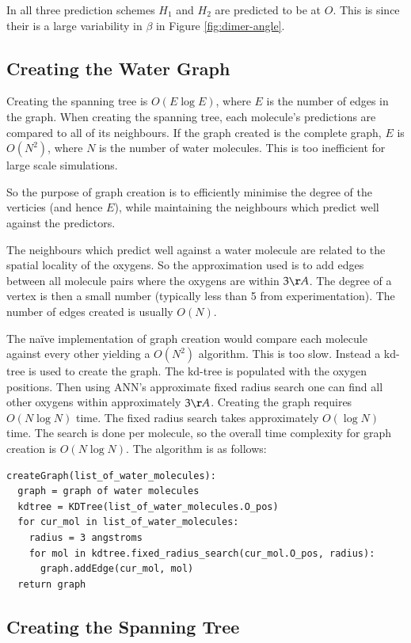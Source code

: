 \documentclass[a4paper]{report}
\begin{document}
In all three prediction schemes $H_1$ and $H_2$ are predicted to be at
$O$. This is since their is a large variability in $\beta$ in Figure
\ref{fig:dimer-angle}.


\subsection{Creating the Water Graph}

Creating the spanning tree is $O(E \log E)$, where $E$ is the number of edges
in the graph. When creating the spanning tree, each molecule's predictions are
compared to all of its neighbours. If the graph created is the complete graph,
$E$ is $O(N^2)$, where $N$ is the number of water molecules. This is too
inefficient for large scale simulations.

So the purpose of graph creation is to efficiently minimise the degree of the
verticies (and hence $E$), while maintaining the neighbours which predict well
against the predictors.

The neighbours which predict well against a water molecule are related to the
spatial locality of the oxygens. So the approximation used is to add edges
between all molecule pairs where the oxygens are within $3\AA$. The degree of
a vertex is then a small number (typically less than 5 from
experimentation). The number of edges created is usually $O(N)$.

The na\"{i}ve implementation of graph creation would compare each molecule
against every other yielding a $O(N^2)$ algorithm. This is too slow. Instead a
kd-tree is used to create the graph. The kd-tree is populated with the oxygen
positions. Then using ANN's approximate fixed radius search one can find all
other oxygens within approximately $3\AA$. Creating the graph requires $O(N
\log N)$ time. The fixed radius search takes approximately $O(\log N)$
time. The search is done per molecule, so the overall time complexity for
graph creation is $O(N \log N)$. The algorithm is as follows:

\begin{verbatim}
createGraph(list_of_water_molecules):
  graph = graph of water molecules
  kdtree = KDTree(list_of_water_molecules.O_pos)
  for cur_mol in list_of_water_molecules:
    radius = 3 angstroms
    for mol in kdtree.fixed_radius_search(cur_mol.O_pos, radius):
      graph.addEdge(cur_mol, mol)
  return graph
\end{verbatim}



\subsection{Creating the Spanning Tree}
\end{document}
